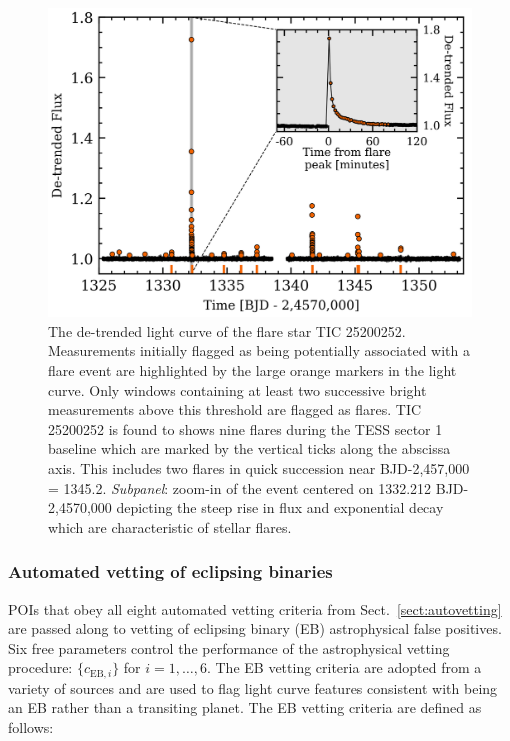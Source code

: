\begin{figure}
  \centering
  \includegraphics[width=0.8\hsize]{figures/flareLC_25200252.png}
  \caption[Examples of flares detected in the TIC 25200252 light curve.]
      {The de-trended light curve of the flare star TIC 25200252. Measurements initially flagged
    as being potentially associated with a flare event are highlighted by the
    large orange markers in the light curve. Only windows containing at least two successive
    bright measurements above this threshold are flagged as flares. TIC 25200252 is found to shows nine flares
    during the TESS sector 1 baseline which are marked by the vertical ticks along the abscissa axis.
    This includes two flares in quick succession near BJD-2,457,000 = 1345.2.
    \emph{Subpanel}: zoom-in of the event centered on 1332.212 BJD-2,4570,000 depicting the steep rise
    in flux and exponential decay which are characteristic of stellar flares.}
  \label{fig:flare}
\end{figure}


\subsubsection{Automated vetting of eclipsing binaries} \label{sect:autoEB}
POIs that obey all eight automated vetting criteria from Sect.~\ref{sect:autovetting}
are passed along to vetting of eclipsing binary (EB) astrophysical false
positives. Six free parameters control the
performance of the astrophysical vetting procedure: $\{c_{\text{EB},i}\}$ for $i=1,\dots,6$.
The EB vetting criteria are adopted from a variety of sources
\citep{batalha10,bryson13,gunther17,crossfield18}
and are used to flag light curve features consistent with being an EB rather than a transiting
planet. The EB vetting criteria are defined as follows:

